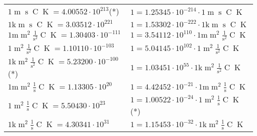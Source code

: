 \begin{center}
\begin{longtable}{l l}
{\color{black}$1 \bm{\mathrm{ }}{\operatorname{m}}{\operatorname{s}}{\operatorname{C}}{\operatorname{K}} = 4.00552\cdot10^{213} $}\quad(*) & {\color{black}$ 1 = 1.25345\cdot10^{-214} \cdot 1 \bm{\mathrm{ }}{\operatorname{m}}{\operatorname{s}}{\operatorname{C}}{\operatorname{K}}$}  \\
{\color{gray}$1 \bm{\mathrm{ k}}{\operatorname{m}}{\operatorname{s}}{\operatorname{C}}{\operatorname{K}} = 3.03512\cdot10^{221} $}   & {\color{gray}$ 1 = 1.53302\cdot10^{-222} \cdot 1 \bm{\mathrm{ k}}{\operatorname{m}}{\operatorname{s}}{\operatorname{C}}{\operatorname{K}}$}  \\
{\color{gray}$1 \bm{\mathrm{ m}}{\operatorname{m}^2}\frac1{\operatorname{s}^2}{\operatorname{C}}{\operatorname{K}} = 1.30403\cdot10^{-111} $}   & {\color{gray}$ 1 = 3.54112\cdot10^{110} \cdot 1 \bm{\mathrm{ m}}{\operatorname{m}^2}\frac1{\operatorname{s}^2}{\operatorname{C}}{\operatorname{K}}$}  \\
{\color{black}$1 \bm{\mathrm{ }}{\operatorname{m}^2}\frac1{\operatorname{s}^2}{\operatorname{C}}{\operatorname{K}} = 1.10110\cdot10^{-103} $}   & {\color{black}$ 1 = 5.04145\cdot10^{102} \cdot 1 \bm{\mathrm{ }}{\operatorname{m}^2}\frac1{\operatorname{s}^2}{\operatorname{C}}{\operatorname{K}}$}  \\
{\color{gray}$1 \bm{\mathrm{ k}}{\operatorname{m}^2}\frac1{\operatorname{s}^2}{\operatorname{C}}{\operatorname{K}} = 5.23200\cdot10^{-100} $}\quad(*) & {\color{gray}$ 1 = 1.03451\cdot10^{55} \cdot 1 \bm{\mathrm{ k}}{\operatorname{m}^2}\frac1{\operatorname{s}^2}{\operatorname{C}}{\operatorname{K}}$}  \\
{\color{gray}$1 \bm{\mathrm{ m}}{\operatorname{m}^2}\frac1{\operatorname{s}}{\operatorname{C}}{\operatorname{K}} = 1.13305\cdot10^{20} $}   & {\color{gray}$ 1 = 4.42452\cdot10^{-21} \cdot 1 \bm{\mathrm{ m}}{\operatorname{m}^2}\frac1{\operatorname{s}}{\operatorname{C}}{\operatorname{K}}$}  \\
{\color{black}$1 \bm{\mathrm{ }}{\operatorname{m}^2}\frac1{\operatorname{s}}{\operatorname{C}}{\operatorname{K}} = 5.50430\cdot10^{23} $}   & {\color{black}$ 1 = 1.00522\cdot10^{-24} \cdot 1 \bm{\mathrm{ }}{\operatorname{m}^2}\frac1{\operatorname{s}}{\operatorname{C}}{\operatorname{K}}$}\quad(*)\\
{\color{gray}$1 \bm{\mathrm{ k}}{\operatorname{m}^2}\frac1{\operatorname{s}}{\operatorname{C}}{\operatorname{K}} = 4.30341\cdot10^{31} $}   & {\color{gray}$ 1 = 1.15453\cdot10^{-32} \cdot 1 \bm{\mathrm{ k}}{\operatorname{m}^2}\frac1{\operatorname{s}}{\operatorname{C}}{\operatorname{K}}$}  \\

\end{longtable}
\end{center}
